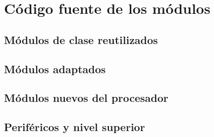 \newpage
\section{Código fuente de los módulos}\label{ap:codigo}
\subsection{Módulos de clase reutilizados}





\subsection{Módulos adaptados}




\subsection{Módulos nuevos del procesador}




\subsection{Periféricos y nivel superior}








